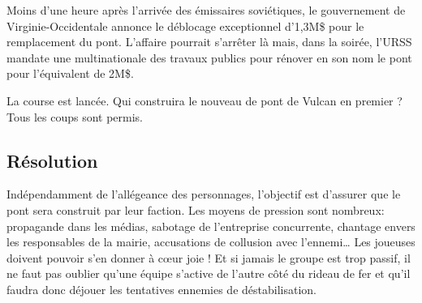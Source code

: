 Moins d'une heure après l'arrivée des émissaires soviétiques, le gouvernement de Virginie-Occidentale annonce le déblocage exceptionnel d'1,3M\$ pour le remplacement du pont.
L'affaire pourrait s'arrêter là mais, dans la soirée, l'URSS mandate une multinationale des travaux publics pour rénover en son nom le pont pour l'équivalent de 2M\$.

La course est lancée.
Qui construira le nouveau de pont de Vulcan en premier ?
Tous les coups sont permis.

\subsection{Résolution}

Indépendamment de l'allégeance des personnages, l'objectif est d'assurer que le pont sera construit par leur faction.
Les moyens de pression sont nombreux: propagande dans les médias, sabotage de l'entreprise concurrente, chantage envers les responsables de la mairie, accusations de collusion avec l'ennemi\dots
Les joueuses doivent pouvoir s'en donner à cœur joie ! Et si jamais le groupe est trop passif, il ne faut pas oublier qu'une équipe s'active de l'autre côté du rideau de fer et qu'il faudra donc déjouer les tentatives ennemies de déstabilisation.
